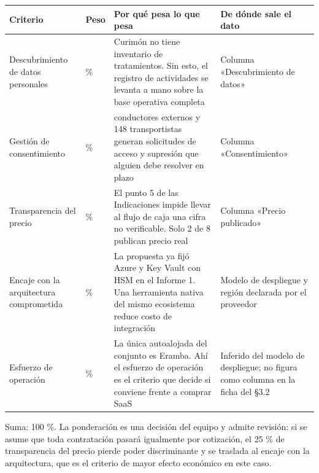 {\def\LTcaptype{none} %
\begin{longtable}[]{@{}
  >{\raggedright\arraybackslash}p{}
  >{\centering\arraybackslash}p{}
  >{\raggedright\arraybackslash}p{}
  >{\raggedright\arraybackslash}p{}@{}}
\toprule\noalign{}
\begin{minipage}[b]{\linewidth}\raggedright
Criterio
\end{minipage} & \begin{minipage}[b]{\linewidth}\centering
Peso
\end{minipage} & \begin{minipage}[b]{\linewidth}\raggedright
Por qué pesa lo que pesa
\end{minipage} & \begin{minipage}[b]{\linewidth}\raggedright
De dónde sale el dato
\end{minipage} \\
\midrule\noalign{}
\endhead
\bottomrule\noalign{}
\endlastfoot
Descubrimiento de datos personales & 25 \% & Curimón no tiene inventario de tratamientos. Sin esto, el registro de actividades se levanta a mano sobre la base operativa completa & Columna «Descubrimiento de datos» \\
Gestión de consentimiento & 20 \% & 258 conductores externos y 148 transportistas generan solicitudes de acceso y supresión que alguien debe resolver en plazo & Columna «Consentimiento» \\
Transparencia del precio & 25 \% & El punto 5 de las Indicaciones impide llevar al flujo de caja una cifra no verificable. Solo 2 de 8 publican precio real & Columna «Precio publicado» \\
Encaje con la arquitectura comprometida & 20 \% & La propuesta ya fijó Azure y Key Vault con HSM en el Informe 1. Una herramienta nativa del mismo ecosistema reduce costo de integración & Modelo de despliegue y región declarada por el proveedor \\
Esfuerzo de operación & 10 \% & La única autoalojada del conjunto es Eramba. Ahí el esfuerzo de operación es el criterio que decide si conviene frente a comprar SaaS & Inferido del modelo de despliegue; no figura como columna en la ficha del §3.2 \\
\end{longtable}
}

Suma: 100 \%. La ponderación es una decisión del equipo y admite revisión: si se asume que toda contratación pasará igualmente por cotización, el 25 \% de transparencia del precio pierde poder discriminante y se traslada al encaje con la arquitectura, que es el criterio de mayor efecto económico en este caso.

